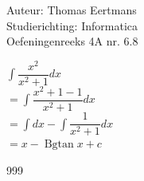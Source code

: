 \documentclass[a4paper]{article}
\newcommand{\Bgtan}{\operatorname{Bgtan}}
\begin{document}
  
\noindent \large Auteur: Thomas Eertmans \\
\noindent \large Studierichting: Informatica\\
\noindent \large Oefeningenreeks 4A nr. 6.8\\

\medskip

\normalsize

$\displaystyle\int \dfrac{x^2}{x^2+1}dx$ \\

$= \displaystyle\int \dfrac{x^2+1-1}{x^2+1}dx$ \\

$= \displaystyle\int dx - \displaystyle\int \dfrac{1}{x^2+1}dx$ \\

$= x - \Bgtan x + c$

\begin{thebibliography}{999}
\end{thebibliography}
\end{document}
